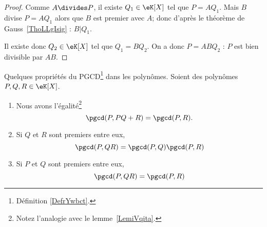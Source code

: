 \begin{proof}
	Comme \( A\divides P\), il existe \( Q_1\in \eK[X]\) tel que \( P=AQ_1\). Mais \( B\) divise \( P=AQ_1\) alors que \( B\) est premier avec \( A\); donc d'après le théorème de Gauss~\ref{ThoLLgIsig} : \( B|Q_1\).

	Il existe donc \( Q_2\in \eK[X]\) tel que \( Q_1=BQ_2\). On a donc \( P=ABQ_2\) : \( P\) est bien divisible par \( AB\).
\end{proof}

\begin{lemma}   \label{LemUELTuwK}
	Quelques propriétés du PGCD\footnote{Définition \ref{DefrYwbct}.} dans les polynômes. Soient des polynômes \( P,Q,R\in \eK[X]\).
	\begin{enumerate}
		\item       \label{ITEMooBPOZooYeFGjl}
		      Nous avons l'égalité\footnote{Notez l'analogie avec le lemme~\ref{LemiVqita}.}
		      \begin{equation}
			      \pgcd(P,PQ+R)=\pgcd(P,R).
		      \end{equation}
		\item       \label{ITEMooUVGRooNSGDZn}
		      Si \( Q \) et \( R\) sont premiers entre eux,
		      \begin{equation}
			      \pgcd(P,QR)=\pgcd(P,Q)\pgcd(P,R)
		      \end{equation}
		\item       \label{ITEMooYXAHooXibkgV}
		      Si \( P\) et \( Q\) sont premiers entre eux,
		      \begin{equation}
			      \pgcd(P,QR)=\pgcd(P,R)
		      \end{equation}
	\end{enumerate}
\end{lemma}

